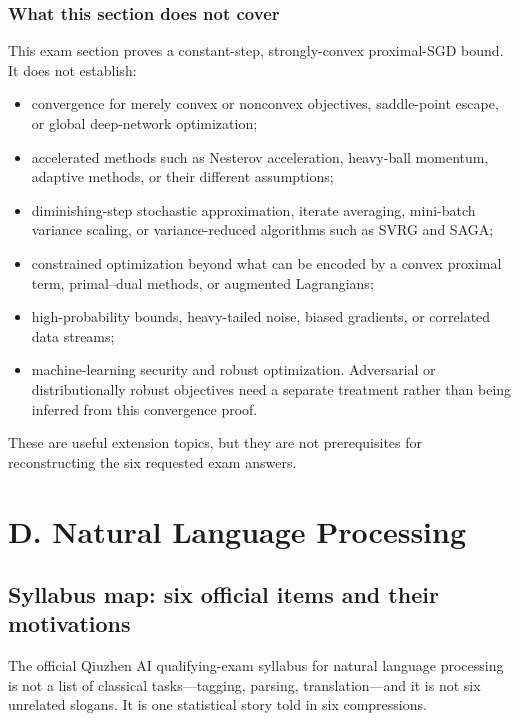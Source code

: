 \documentclass[11pt,a4paper]{article}
\theoremstyle{definition}
\begin{document}
\subsubsection{What this section does not cover}

This exam section proves a constant-step, strongly-convex proximal-SGD bound. It does not establish:

\begin{itemize}
  \item convergence for merely convex or nonconvex objectives, saddle-point escape, or global deep-network optimization;
  \item accelerated methods such as Nesterov acceleration, heavy-ball momentum, adaptive methods, or their different assumptions;
  \item diminishing-step stochastic approximation, iterate averaging, mini-batch variance scaling, or variance-reduced algorithms such as SVRG and SAGA;
  \item constrained optimization beyond what can be encoded by a convex proximal term, primal--dual methods, or augmented Lagrangians;
  \item high-probability bounds, heavy-tailed noise, biased gradients, or correlated data streams;
  \item machine-learning security and robust optimization. Adversarial or distributionally robust objectives need a separate treatment rather than being inferred from this convergence proof.
\end{itemize}

These are useful extension topics, but they are not prerequisites for reconstructing the six requested exam answers.



\section{D. Natural Language Processing}

\subsection{Syllabus map: six official items and their motivations}
\label{sec:spr2025-nlp-syllabus}

The official Qiuzhen AI qualifying-exam syllabus for natural language processing is not a list of classical tasks---tagging, parsing, translation---and it is not six unrelated slogans. It is one statistical story told in six compressions.
\end{document}
